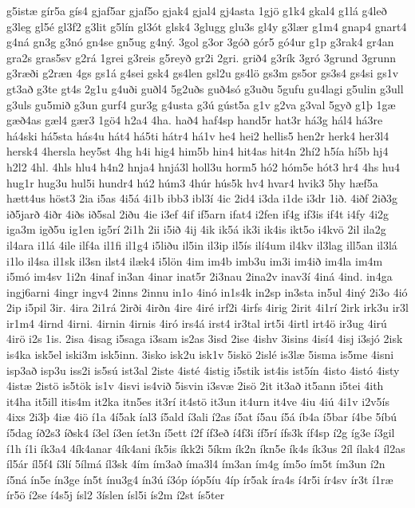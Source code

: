 {g5istæ
gír5a
gís4
gjaf5ar
gjaf5o
gjak4
gjal4
gj4asta
1gjö
g1k4
gkal4
g1lá
g4leð
g3leg
gl5é
gl3f2
g3lit
g5lín
gl3ót
glsk4
3glugg
glu3s
gl4y
g3lær
g1m4
gnap4
gnart4
g4ná
gn3g
g3nó
gn4se
gn5ug
g4ný.
3gol
g3or
3góð
gór5
gó4ur
g1p
g3rak4
gr4an
gra2s
gras5sv
g2rá
1grei
g3reis
g5reyð
gr2i
2gri.
grið4
g3rík
3gró
3grund
3grunn
g3ræði
g2ræn
4gs
gs1á
g4sei
gsk4
gs4len
gsl2u
gs4lö
gs3m
gs5or
gs3s4
gs4si
gs1v
gt3að
g3te
gt4s
2g1u
g4uði
guðl4
5g2uðs
guð4só
g3uðu
5gufu
gu4lagi
g5ulin
g3ull
g3uls
gu5mið
g3un
gurf4
gur3g
g4usta
g3ú
gúst5a
g1v
g2va
g3val
5gyð
g1þ
1gæ
gæð4as
gæl4
gær3
1gö4
h2a4
4ha.
hað4
haf4sp
hand5r
hat3r
há3g
hál4
há3re
há4ski
há5sta
hás4u
hát4
há5ti
hátr4
há1v
he4
hei2
hellis5
hen2r
herk4
her3l4
hersk4
4hersla
hey5st
4hg
h4i
hig4
him5b
hin4
hit4as
hit4n
2hí2
h5ía
hí5b
hj4
h2l2
4hl.
4hls
hlu4
h4n2
hnja4
hnjá3l
holl3u
horm5
hó2
hóm5e
hót3
hr4
4hs
hu4
hug1r
hug3u
hul5i
hundr4
hú2
húm3
4húr
hús5k
hv4
hvar4
hvik3
5hy
hæf5a
hætt4us
höst3
2ia
i5as
4i5á
4i1b
ibb3
ibl3í
4ic
2id4
i3da
i1de
i3dr
1ið.
4iðf
2ið3g
ið5jarð
4iðr
4iðs
ið5sal
2iðu
4ie
i3ef
4if
if5arn
ifat4
i2fen
if4g
if3is
if4t
i4fy
4i2g
iga3m
igð5u
ig1en
ig5rí
2i1h
2ii
i5ið
4ij
4ik
ik5á
ik3i
ik4is
ikt5o
i4kvö
2il
ila2g
il4ara
i1lá
4ile
ilf4a
il1fi
il1g4
i5liðu
il5in
il3ip
il5ís
ilí4um
il4kv
il3lag
ill5an
il3lá
i1lo
il4sa
il1sk
il3sn
ilst4
ilæk4
i5lön
4im
im4b
imb3u
im3i
im4ið
im4la
im4m
i5mó
im4sv
1i2n
4inaf
in3an
4inar
inat5r
2i3nau
2ina2v
inav3í
4iná
4ind.
in4ga
ingj6arni
4ingr
ingv4
2inns
2innu
in1o
4inó
in1s4k
in2sp
in3sta
in5ul
4iný
2i3o
4ió
2ip
i5pil
3ir.
4ira
2i1rá
2irði
4irðn
4ire
4iré
irf2i
4irfs
4irig
2irit
4i1rí
2irk
irk3u
ir3l
ir1m4
4irnd
4irni.
4irnin
4irnis
4iró
irs4á
irst4
ir3tal
irt5i
4irtl
irt4ö
ir3ug
4irú
4irö
i2s
1is.
2isa
4isag
i5saga
i3sam
is2as
3isd
2ise
4ishv
3isins
4isí4
4isj
i3sjó
2isk
is4ka
isk5el
iski3m
isk5inn.
3isko
isk2u
isk1v
5iskö
2islé
is3læ
5isma
is5me
4isni
isp3að
isp3u
iss2i
is5sú
ist3al
2iste
4isté
4istig
i5stik
ist4is
ist5ín
4isto
4istó
4isty
4istæ
2istö
is5tök
is1v
4isvi
is4við
5isvin
i3svæ
2isö
2it
it3að
it5ann
i5tei
4ith
it4ha
it5ill
itis4m
it2ka
itn5es
it3rí
it4stö
it3un
it4urn
it4ve
4iu
4iú
4i1v
i2v5ís
4ixs
2i3þ
4iæ
4iö
í1a
4í5ak
íal3
í5ald
í3ali
í2as
í5at
í5au
í5á
íb4a
í5bar
í4be
5íbú
í5dag
íð2s3
íðsk4
í3el
í3en
íet3n
í5ett
í2f
íf3eð
í4f3i
íf5rí
ífs3k
íf4sp
í2g
íg3e
í3gil
í1h
í1i
ík3a4
4ík4anar
4ík4ani
ík5is
íkk2i
5íkm
ík2n
íkn5e
ík4s
ík3us
2íl
ílak4
íl2as
íl5ár
íl5f4
í3lí
5ílmá
íl3sk
4ím
ím3að
íma3l4
ím3an
ím4g
ím5o
ím5t
ím3un
í2n
í5ná
ín5e
ín3ge
ín5t
ínu3g4
ín3ú
í3óp
íóp5íu
4íp
ír5ak
íra4s
í4r5i
ír4sv
ír3t
í1ræ
ír5ö
í2se
í4s5j
ísl2
3íslen
ísl5i
ís2m
í2st
ís5ter
}
